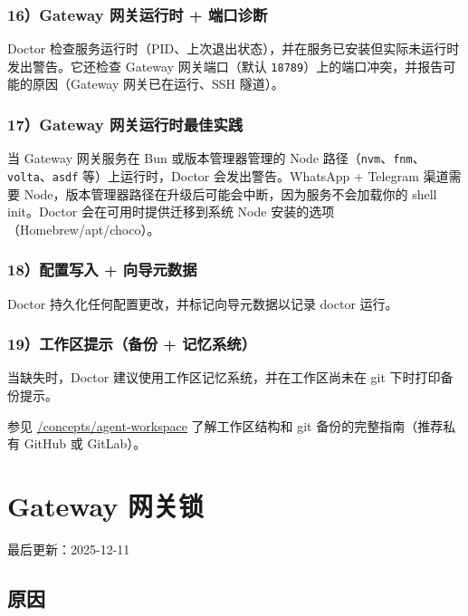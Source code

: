 \subsubsection{16）Gateway 网关运行时 + 端口诊断}


Doctor 检查服务运行时（PID、上次退出状态），并在服务已安装但实际未运行时发出警告。它还检查 Gateway 网关端口（默认 \texttt{18789}）上的端口冲突，并报告可能的原因（Gateway 网关已在运行、SSH 隧道）。

\subsubsection{17）Gateway 网关运行时最佳实践}


当 Gateway 网关服务在 Bun 或版本管理器管理的 Node 路径（\texttt{nvm}、\texttt{fnm}、\texttt{volta}、\texttt{asdf} 等）上运行时，Doctor 会发出警告。WhatsApp + Telegram 渠道需要 Node，版本管理器路径在升级后可能会中断，因为服务不会加载你的 shell init。Doctor 会在可用时提供迁移到系统 Node 安装的选项（Homebrew/apt/choco）。

\subsubsection{18）配置写入 + 向导元数据}


Doctor 持久化任何配置更改，并标记向导元数据以记录 doctor 运行。

\subsubsection{19）工作区提示（备份 + 记忆系统）}


当缺失时，Doctor 建议使用工作区记忆系统，并在工作区尚未在 git 下时打印备份提示。

参见 \href{/concepts/agent-workspace}{/concepts/agent-workspace} 了解工作区结构和 git 备份的完整指南（推荐私有 GitHub 或 GitLab）。


\clearpage

\section{Gateway 网关锁}


最后更新：2025-12-11

\subsection{原因}


